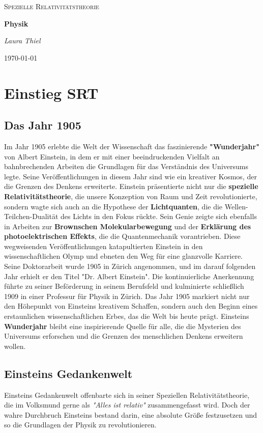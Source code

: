 \documentclass[a4paper]{report}
\begin{document}
\begin{titlepage}
    \centering
	{\LARGE \textsc{Spezielle Relativitätstheorie}\par}
	\vspace{1.5cm}
	{\huge\bfseries Physik\par}
	\vspace{2cm}
	{\Large\itshape Laura Thiel\par}
	{\large \today\par}
\end{titlepage}
\tableofcontents
\chapter{Einstieg SRT}
\section{Das Jahr 1905}
Im Jahr 1905 erlebte die Welt der Wissenschaft das faszinierende \textbf{"Wunderjahr"} von Albert Einstein, in dem er mit einer beeindruckenden Vielfalt an bahnbrechenden Arbeiten die Grundlagen für das Verständnis des Universums legte. Seine Veröffentlichungen in diesem Jahr sind wie ein kreativer Kosmos, der die Grenzen des Denkens erweiterte.
Einstein präsentierte nicht nur die \textbf{spezielle Relativitätstheorie}, die unsere Konzeption von Raum und Zeit revolutionierte, sondern wagte sich auch an die Hypothese der \textbf{Lichtquanten}, die die Wellen-Teilchen-Dualität des Lichts in den Fokus rückte. Sein Genie zeigte sich ebenfalls in Arbeiten zur \textbf{Brownschen Molekularbewegung} und der \textbf{Erklärung des photoelektrischen Effekts}, die die Quantenmechanik vorantrieben.
Diese wegweisenden Veröffentlichungen katapultierten Einstein in den wissenschaftlichen Olymp und ebneten den Weg für eine glanzvolle Karriere. Seine Doktorarbeit wurde 1905 in Zürich angenommen, und im darauf folgenden Jahr erhielt er den Titel "Dr. Albert Einstein". Die kontinuierliche Anerkennung führte zu seiner Beförderung in seinem Berufsfeld und kulminierte schließlich 1909 in einer Professur für Physik in Zürich.
Das Jahr 1905 markiert nicht nur den Höhepunkt von Einsteins kreativem Schaffen, sondern auch den Beginn eines erstaunlichen wissenschaftlichen Erbes, das die Welt bis heute prägt. Einsteins \textbf{Wunderjahr} bleibt eine inspirierende Quelle für alle, die die Mysterien des Universums erforschen und die Grenzen des menschlichen Denkens erweitern wollen.
\section{Einsteins Gedankenwelt}
Einsteins Gedankenwelt offenbarte sich in seiner Speziellen Relativitätstheorie, die im Volksmund gerne als \emph{"Alles ist relativ"} zusammengefasst wird. Doch der wahre Durchbruch Einsteins bestand darin, eine absolute Größe festzusetzen und so die Grundlagen der Physik zu revolutionieren.
\end{document}
